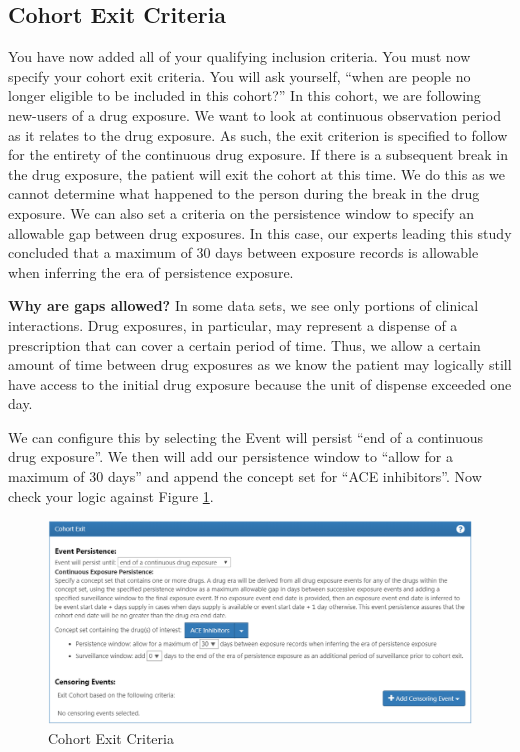 \documentclass[11pt]{book}
\theoremstyle{definition}
\theoremstyle{definition}
\theoremstyle{definition}
\theoremstyle{remark}
\begin{document}
\subsection{Cohort Exit Criteria}\label{cohort-exit-criteria}

You have now added all of your qualifying inclusion criteria. You must
now specify your cohort exit criteria. You will ask yourself, ``when are
people no longer eligible to be included in this cohort?'' In this
cohort, we are following new-users of a drug exposure. We want to look
at continuous observation period as it relates to the drug exposure. As
such, the exit criterion is specified to follow for the entirety of the
continuous drug exposure. If there is a subsequent break in the drug
exposure, the patient will exit the cohort at this time. We do this as
we cannot determine what happened to the person during the break in the
drug exposure. We can also set a criteria on the persistence window to
specify an allowable gap between drug exposures. In this case, our
experts leading this study concluded that a maximum of 30 days between
exposure records is allowable when inferring the era of persistence
exposure.

\textbf{Why are gaps allowed?} In some data sets, we see only portions
of clinical interactions. Drug exposures, in particular, may represent a
dispense of a prescription that can cover a certain period of time.
Thus, we allow a certain amount of time between drug exposures as we
know the patient may logically still have access to the initial drug
exposure because the unit of dispense exceeded one day.

We can configure this by selecting the Event will persist ``end of a
continuous drug exposure''. We then will add our persistence window to
``allow for a maximum of 30 days'' and append the concept set for ``ACE
inhibitors''. Now check your logic against Figure
\ref{fig:ATLAScohortexit}.

\begin{figure}

{\centering \includegraphics[width=1\linewidth]{images/Cohorts/cohort-exit} 

}

\caption{Cohort Exit Criteria}\label{fig:ATLAScohortexit}
\end{figure}
\end{document}
